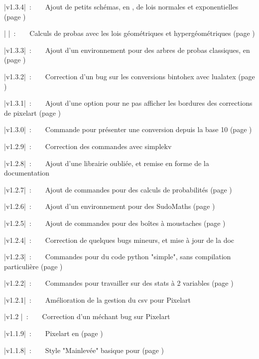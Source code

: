 \documentclass{article}
\begin{document}
{\small \bverb|v1.3.4|~:~~~~Ajout de petits schémas, en \TikZ{}, de lois normales et exponentielles (page \pageref{schemasprobas})

{\small \bverb|      |~:~~~~Calculs de probas avec les lois géométriques et hypergéométriques (page \pageref{calcprobas})
	
{\small \bverb|v1.3.3|~:~~~~Ajout d'un environnement pour des arbres de probas classiques, en \TikZ{} (page \pageref{arbresprobas})
	
{\small \bverb|v1.3.2|~:~~~~Correction d'un bug sur les conversions bintohex avec lualatex (page \pageref{conversions})

{\small \bverb|v1.3.1|~:~~~~Ajout d'une option pour ne pas afficher les bordures des corrections de pixelart (page \pageref{pixelart})

{\small \bverb|v1.3.0|~:~~~~Commande pour présenter une conversion depuis la base 10 (page \pageref{convrestes})

{\small \bverb|v1.2.9|~:~~~~Correction des commandes avec \textsf{simplekv}

{\small \bverb|v1.2.8|~:~~~~Ajout d'une librairie \TikZ{} oubliée, et remise en forme de la documentation

{\small \bverb|v1.2.7|~:~~~~Ajout de commandes pour des calculs de probabilités (page \pageref{calcprobas})

{\small \bverb|v1.2.6|~:~~~~Ajout d'un environnement pour des SudoMaths (page \pageref{sudomaths})

{\small \bverb|v1.2.5|~:~~~~Ajout de commandes pour des boîtes à moustaches (page \pageref{boiteamoustaches})

{\small \bverb|v1.2.4|~:~~~~Correction de quelques bugs mineurs, et mise à jour de la doc

{\small \bverb|v1.2.3|~:~~~~Commandes pour du code python "simple", sans compilation particulière (page \pageref{pythonsimple})

{\small \bverb|v1.2.2|~:~~~~Commandes pour travailler sur des stats à 2 variables (page \pageref{statsdeuxvars})

{\small \bverb|v1.2.1|~:~~~~Amélioration de la gestion du csv pour Pixelart

{\small \bverb|v1.2  |~:~~~~Correction d'un méchant bug sur Pixelart

{\small \bverb|v1.1.9|~:~~~~Pixelart en \TikZ{} (page \pageref{pixelart})

{\small \bverb|v1.1.8|~:~~~~Style "Mainlevée" basique pour \TikZ (page \pageref{mainlevee})

}}}}}}}}}}}}}}}}}}
\end{document}
